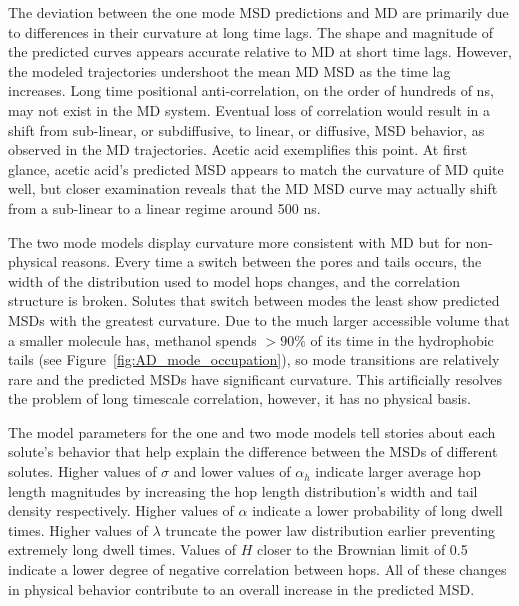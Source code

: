 \documentclass[journal=ancac3,manuscript=article,layout=twocolumn]{achemso}
\begin{document}
  The deviation between the one mode MSD predictions and MD are primarily due
  to differences in their curvature at long time lags. The shape and magnitude
  of the predicted curves appears accurate relative to MD at short time lags.
  However, the modeled trajectories undershoot the mean MD MSD as the time lag
  increases. Long time positional anti-correlation, on the order of hundreds of
  ns, may not exist in the MD system. Eventual loss of correlation would result 
  in a shift from sub-linear, or subdiffusive, to linear, or diffusive, MSD behavior, as observed in the MD 
  trajectories. Acetic acid exemplifies this point. At first glance, acetic acid's
  predicted MSD appears to match the curvature of MD quite well, but closer 
  examination reveals that
  the MD MSD curve may actually shift from a sub-linear to a linear regime around
  500 ns.
  
  The two mode models display curvature more consistent with MD but for
  non-physical reasons. Every time a switch between the pores and tails occurs,
  the width of the distribution used to model hops changes, and the correlation structure is broken. 
  Solutes that switch between modes the least show
  predicted MSDs with the greatest curvature. Due to the much larger
  accessible volume that a smaller molecule has, methanol spends $>90\%$ of its
  time in the hydrophobic tails (see Figure~\ref{fig:AD_mode_occupation}), so
  mode transitions are relatively rare and the predicted MSDs have significant
  curvature. This artificially resolves the problem of long timescale
  correlation, however, it has no physical basis.
  
  The model parameters for the one and two mode models tell stories about each
  solute's behavior that help explain the difference between the MSDs of
  different solutes. Higher values of $\sigma$ and lower values of $\alpha_h$
  indicate larger average hop length magnitudes by increasing the hop length
  distribution's width and tail density respectively. Higher values of $\alpha$
  indicate a lower probability of long dwell times. Higher values of $\lambda$
  truncate the power law distribution earlier preventing extremely long dwell
  times. Values of $H$ closer to the Brownian limit of 0.5 indicate a lower
  degree of negative correlation between hops. All of these changes in physical
  behavior contribute to an overall increase in the predicted MSD.
\end{document}
